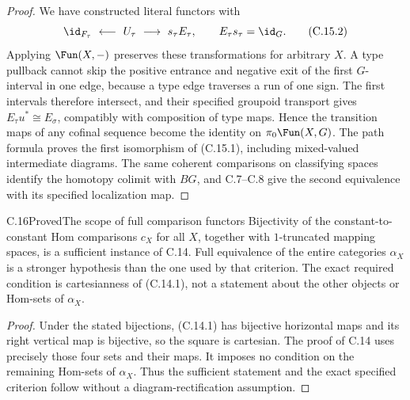 \begin{proof}
We have constructed literal functors with
\[
 \id_{F_\tau}\ \longleftarrow\ U_\tau\
     \longrightarrow\ s_\tau E_\tau,
 \qquad E_\tau s_\tau=\id_G. \tag{C.15.2}
\]
Applying $\Fun(X,-)$ preserves these transformations for arbitrary $X$. A type pullback cannot skip the positive entrance and negative exit of the first $G$-interval in one edge, because a type edge traverses a run of one sign. The first intervals therefore intersect, and their specified groupoid transport gives $E_\tau u^*\cong E_\sigma$, compatibly with composition of type maps. Hence the transition maps of any cofinal sequence become the identity on $\pi_0\Fun(X,G)$. The path formula proves the first isomorphism of (C.15.1), including mixed-valued intermediate diagrams. The same coherent comparisons on classifying spaces identify the homotopy colimit with $BG$, and C.7--C.8 give the second equivalence with its specified localization map.
\end{proof}

\begin{claim}{C.16}{Proved}{The scope of full comparison functors}
Bijectivity of the constant-to-constant Hom comparisons $c_X$ for all $X$, together with $1$-truncated mapping spaces, is a sufficient instance of C.14. Full equivalence of the entire categories $\alpha_X$ is a stronger hypothesis than the one used by that criterion. The exact required condition is cartesianness of (C.14.1), not a statement about the other objects or Hom-sets of $\alpha_X$.
\end{claim}
\begin{proof}
Under the stated bijections, (C.14.1) has bijective horizontal maps and its right vertical map is bijective, so the square is cartesian. The proof of C.14 uses precisely those four sets and their maps. It imposes no condition on the remaining Hom-sets of $\alpha_X$. Thus the sufficient statement and the exact specified criterion follow without a diagram-rectification assumption.
\end{proof}
